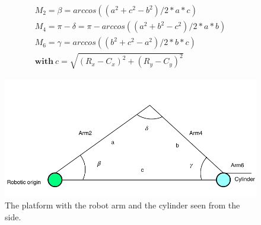 \begin{equation}
\label{eq:config}
\begin{aligned}
M_2=\beta=arccos((a^2+c^2-b^2)/2*a*c)\\
M_4=\pi-\delta=\pi-arccos((a^2+b^2-c^2)/2*a*b)\\
M_6=\gamma=arccos((b^2+c^2-a^2)/2*b*c)\\
\textbf{with}\ c=\sqrt{(R_x-C_x)^2+(R_y-C_y)^2}
\end{aligned}
\end{equation}

\begin{figure}[tpb]
\centering
	\includegraphics[width=0.9\linewidth]{figures/right_v.pdf} 
	\caption{The platform with the robot arm and the cylinder seen from the side.}
	\label{fig:right}
\end{figure}



